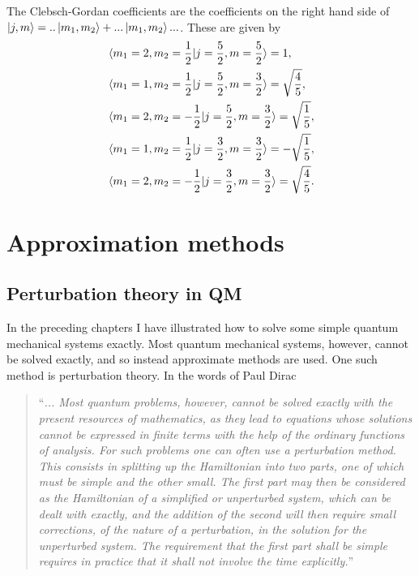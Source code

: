 \begin{example}
\begin{enumerate}
		The Clebsch-Gordan coefficients are the coefficients on the right hand side of $\ket{j,m}=..\ket{m_1,m_2}+...\ket{m_1,m_2}...$. These are given by
		\begin{equation}
			\begin{split}
				&\braket{m_1=2,m_2=\frac{1}{2}|j=\frac{5}{2},m=\frac{5}{2}}=1,\\
				&\braket{m_1=1,m_2=\frac{1}{2}|j=\frac{5}{2},m=\frac{3}{2}}=\sqrt{\frac{4}{5}},\\
				&\braket{m_1=2,m_2=-\frac{1}{2}|j=\frac{5}{2},m=\frac{3}{2}}=\sqrt{\frac{1}{5}},\\
				&\braket{m_1=1,m_2=\frac{1}{2}|j=\frac{3}{2},m=\frac{3}{2}}=-\sqrt{\frac{1}{5}},\\
				&\braket{m_1=2,m_2=-\frac{1}{2}|j=\frac{3}{2},m=\frac{3}{2}}=\sqrt{\frac{4}{5}}.\\
			\end{split}
		\end{equation} 
		
	\end{enumerate}
\end{example}


\chapter{Approximation methods}


\section{Perturbation theory in QM}
\label{chp:TDPT}
In the preceding chapters I have illustrated how to solve some simple quantum mechanical systems exactly. Most quantum mechanical systems, however, cannot be solved exactly, and so instead approximate methods are used. One such method is perturbation theory. In the words of Paul Dirac~\citep[p.167]{dirac} 

\begin{quote}
	“\textit{... Most quantum problems, however, cannot be solved exactly with the present resources of mathematics, as they lead to equations whose solutions cannot be expressed in finite terms with the help of the ordinary functions of analysis. For such problems one can often use a perturbation method. This consists in splitting up the Hamiltonian into two parts, one of which must be simple and the other small. The first part may then be considered as the Hamiltonian of a simplified or unperturbed system, which can be dealt with exactly, and the addition of the second will then require small corrections, of the nature of a perturbation, in the solution for the unperturbed system. The requirement that the first part shall be simple requires in practice that it shall not involve the time explicitly.}”
\end{quote} 

